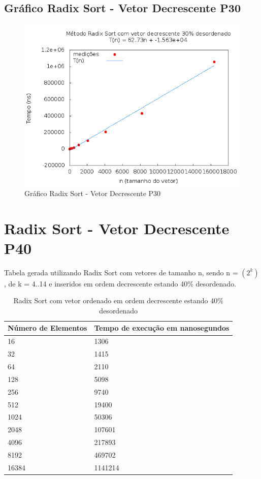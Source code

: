\documentclass[12pt,a4paper,twoside]{report}
\begin{document}
\subsection{Gráfico Radix Sort - Vetor Decrescente P30}
\begin{figure}[H]
    \centering
    \includegraphics[width=0.7\linewidth]{graficos/RadixSort/vIntDecrescenteP30/vIntDecrescenteP30.png}
  \caption{Gráfico Radix Sort - Vetor Decrescente P30}
\end{figure}

\section{Radix Sort - Vetor Decrescente P40}
Tabela gerada utilizando Radix Sort com vetores de tamanho n, sendo n = $(2^k)$, de k = 4..14 e inseridos em ordem decrescente estando 40\% desordenado.
\begin{table}[H]
\centering
\caption{Radix Sort com vetor ordenado em ordem decrescente estando 40\% desordenado}
\label{my-label}
\begin{tabular}{|l|l|}
\hline
\multicolumn{1}{|c|}{\textbf{Número de Elementos}} & \multicolumn{1}{c|}{\textbf{Tempo de execução em nanosegundos}} \\ \hline
16 & 1306 \\ \hline
32 & 1415 \\ \hline
64 & 2110 \\ \hline
128 & 5098 \\ \hline
256 & 9740 \\ \hline
512 & 19400 \\ \hline
1024 & 50306 \\ \hline
2048 & 107601 \\ \hline
4096 & 217893 \\ \hline
8192 & 469702 \\ \hline
16384 & 1141214 \\ \hline
\end{tabular}
\end{table}
\end{document}
